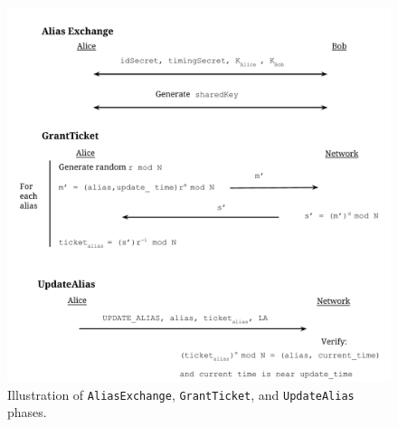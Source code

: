\documentclass[11pt]{article}
\begin{document}


\begin{figure}[t]
	\caption{Illustration of \texttt{AliasExchange}, \texttt{GrantTicket}, and \texttt{UpdateAlias} phases.}
	\centering
	\includegraphics[scale=0.65]{ProtocolsIllustration.pdf}
\end{figure}
\end{document}
